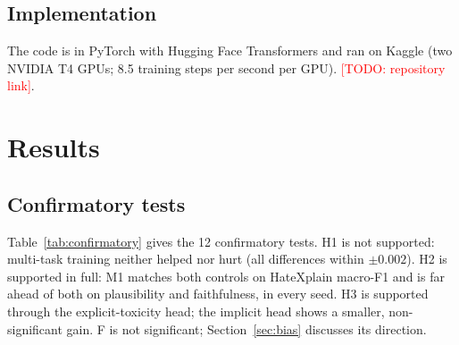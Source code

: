 \documentclass[preprint,12pt,authoryear]{elsarticle}
\newcommand{\todo}[1]{\textcolor{red}{[TODO: #1]}}
\begin{document}
\subsection{Implementation}
The code is in PyTorch with Hugging Face Transformers and ran on Kaggle (two NVIDIA T4 GPUs; 8.5 training steps per second per GPU). \todo{repository link}.

\section{Results}
\label{sec:results}

\subsection{Confirmatory tests}
Table~\ref{tab:confirmatory} gives the 12 confirmatory tests. H1 is not supported: multi-task training neither helped nor hurt (all differences within $\pm0.002$). H2 is supported in full: M1 matches both controls on HateXplain macro-F1 and is far ahead of both on plausibility and faithfulness, in every seed. H3 is supported through the explicit-toxicity head; the implicit head shows a smaller, non-significant gain. F is not significant; Section~\ref{sec:bias} discusses its direction.
\end{document}
